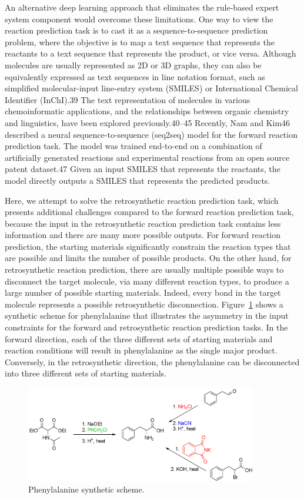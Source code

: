 An alternative deep learning approach that eliminates the rule-based expert system component would overcome these limitations. One way to view the reaction prediction task is to cast it as a sequence-to-sequence prediction problem, where the objective is to map a text sequence that represents the reactants to a text sequence that represents the product, or vice versa. Although molecules are usually represented as 2D or 3D graphs, they can also be equivalently expressed as text sequences in line notation format, such as simplified molecular-input line-entry system (SMILES) \cite{weininger1988smiles} or International Chemical Identifier (InChI).39 The text representation of molecules in various chemoinformatic applications, and the relationships between organic chemistry and linguistics, have been explored previously.40–45 Recently, Nam and Kim46 described a neural sequence-to-sequence (seq2seq) model for the forward reaction prediction task. The model was trained end-to-end on a combination of artificially generated reactions and experimental reactions from an open source patent dataset.47 Given an input SMILES that represents the reactants, the model directly outputs a SMILES that represents the predicted products.

Here, we attempt to solve the retrosynthetic reaction prediction task, which presents additional challenges compared to the forward reaction prediction task, because the input in the retrosynthetic reaction prediction task contains less information and there are many more possible outputs. For forward reaction prediction, the starting materials significantly constrain the reaction types that are possible and limits the number of possible products. On the other hand, for retrosynthetic reaction prediction, there are usually multiple possible ways to disconnect the target molecule, via many different reaction types, to produce a large number of possible starting materials. Indeed, every bond in the target molecule represents a possible retrosynthetic disconnection. Figure~\ref{fig:phenyl} shows a synthetic scheme for phenylalanine that illustrates the asymmetry in the input constraints for the forward and retrosynthetic reaction prediction tasks. In the forward direction, each of the three different sets of starting materials and reaction conditions will result in phenylalanine as the single major product. Conversely, in the retrosynthetic direction, the phenylalanine can be disconnected into three different sets of starting materials. 

\begin{figure}
  \centering
  \includegraphics[width=0.9\textwidth]{Images/phenylalanine_synth.png}
  \caption{Phenylalanine synthetic scheme.}
  \label{fig:phenyl}
\end{figure}

